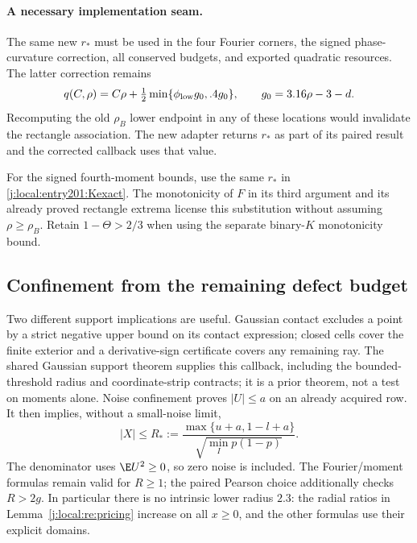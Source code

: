 \paragraph{A necessary implementation seam.}
The same new $r_*$ must be used in the four Fourier corners, the signed
phase-curvature correction, all conserved budgets, and exported quadratic
resources. The latter correction remains
\[
 q(C,\rho)=C\rho+\tfrac12\min\{\phi_{\rm low}g_0,.4g_0\},
 \qquad g_0=3.16\rho-3-d.
\]
Recomputing the old $\rho_B$ lower endpoint in any of these locations would
invalidate the rectangle association. The new adapter returns $r_*$ as
part of its paired result and the corrected callback uses that value.



For the signed fourth-moment bounds, use the same $r_*$ in
\eqref{j:local:entry201:Kexact}. The monotonicity of $F$ in its third argument and its already proved rectangle extrema license this substitution without assuming $\rho\ge\rho_B$. Retain $1-\Theta>2/3$ when using
the separate binary-$K$ monotonicity bound.


\subsection{Confinement from the remaining defect budget}
Two different support implications are useful. Gaussian contact excludes
a point by a strict negative upper bound on its contact expression;
closed cells cover the finite exterior and a derivative-sign certificate
covers any remaining ray. The shared Gaussian support theorem supplies
this callback, including the bounded-threshold radius and coordinate-strip
contracts; it is a prior theorem, not a test on moments alone. Noise confinement proves $|U|\le a$ on an
already acquired row. It then implies, without a small-noise limit,
\begin{equation}\label{j:local:re:radiusfeedback}
 |X|\le R_*:=
 \frac{\max\{u+a,1-l+a\}}{\sqrt{\min_Ip(1-p)}}.
\end{equation}
The denominator uses $\E U^2\ge0$, so zero noise is included.
The Fourier/moment formulas remain valid for $R\ge1$; the paired Pearson
choice additionally checks $R>2g$. In particular there is no intrinsic
lower radius $2.3$: the radial ratios in Lemma~\ref{j:local:re:pricing} increase
on all $x\ge0$, and the other formulas use their explicit domains.

